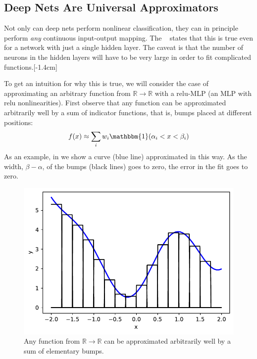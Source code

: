 
\subsection{Deep Nets Are Universal Approximators}\label{sec:neural_nets:universal_approximation}
Not only can deep nets perform nonlinear classification, they can in principle perform \textit{any} continuous input-output mapping. The ~\cite{Cybenko1989} states that this is true even for a network with just a single hidden layer. The caveat is that the number of neurons in the hidden layers will have to be very large in order to fit complicated functions.[-1.4cm]

To get an intuition for why this is true, we will consider the case of approximating an arbitrary function from $\mathbb{R} \rightarrow \mathbb{R}$ with a relu-MLP (an MLP with relu nonlinearities). First observe that any function can be approximated arbitrarily well by a sum of indicator functions, that is, bumps placed at different positions:
\begin{align}
    f(x) \approx \sum_i w_i \mathbbm{1}(\alpha_i < x < \beta_i)\label{eqn:neural_nets:sum_of_indicators}
\end{align}
As an example, in \fig{\ref{fig:neural_nets:curve_as_bump}} we show a curve (blue line) approximated in this way. As the width, $\beta-\alpha$, of the bumps (black lines) goes to zero, the error in the fit goes to zero.
\begin{figure}[h]
    \centerline{
    \includegraphics[width=0.35\linewidth]{./figures/neural_nets/curve_as_bumps.pdf}
    }
    \caption{Any function from $\mathbb{R} \rightarrow \mathbb{R}$ can be approximated arbitrarily well by a sum of elementary bumps.}
    \label{fig:neural_nets:curve_as_bump}
\end{figure}


